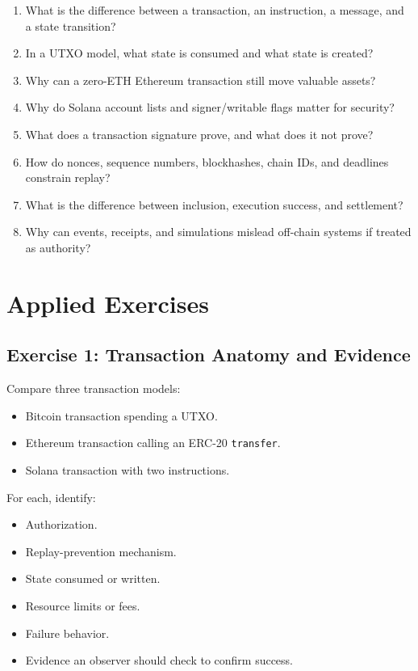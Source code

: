 \begin{enumerate}
\def\labelenumi{\arabic{enumi}.}
\tightlist
\item
  What is the difference between a transaction, an instruction, a
  message, and a state transition?
\item
  In a UTXO model, what state is consumed and what state is created?
\item
  Why can a zero-ETH Ethereum transaction still move valuable assets?
\item
  Why do Solana account lists and signer/writable flags matter for
  security?
\item
  What does a transaction signature prove, and what does it not prove?
\item
  How do nonces, sequence numbers, blockhashes, chain IDs, and deadlines
  constrain replay?
\item
  What is the difference between inclusion, execution success, and
  settlement?
\item
  Why can events, receipts, and simulations mislead off-chain systems if
  treated as authority?
\end{enumerate}

\section{Applied Exercises}

\subsection{Exercise 1: Transaction Anatomy and Evidence}

Compare three transaction models:

\begin{itemize}
\tightlist
\item
  Bitcoin transaction spending a UTXO.
\item
  Ethereum transaction calling an ERC-20
  \passthrough{\lstinline!transfer!}.
\item
  Solana transaction with two instructions.
\end{itemize}

For each, identify:

\begin{itemize}
\tightlist
\item
  Authorization.
\item
  Replay-prevention mechanism.
\item
  State consumed or written.
\item
  Resource limits or fees.
\item
  Failure behavior.
\item
  Evidence an observer should check to confirm success.
\end{itemize}

